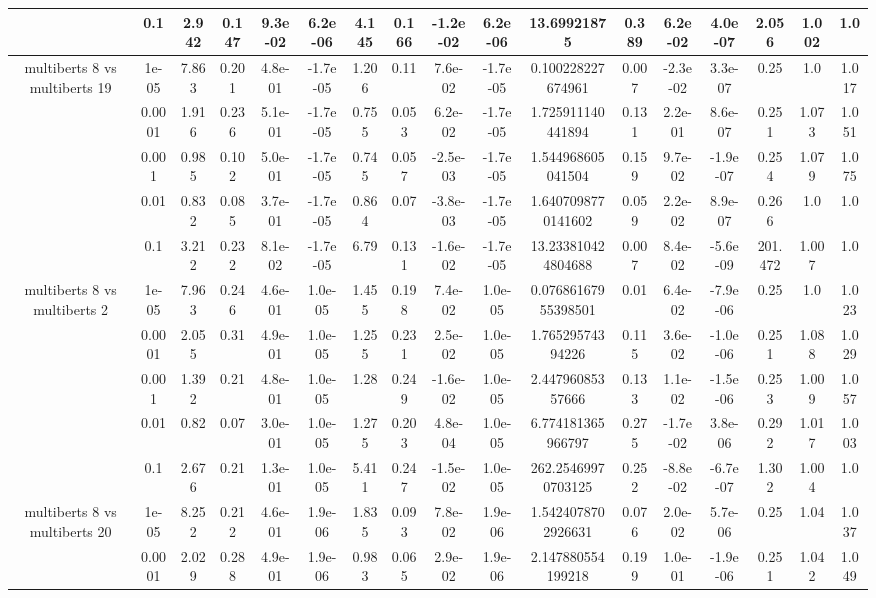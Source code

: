\begin{tabular}{|c|c|c|c|c|c|c|c|c|c|c|c|c|c|c|c|c|}
 & 0.1 & 2.942 & 0.147 & 9.3e-02 & 6.2e-06 & 4.145 & 0.166 & -1.2e-02 & 6.2e-06 & 13.69921875 & 0.389 & 6.2e-02 & 4.0e-07 & 2.056 & 1.002 & 1.0 \\
\hline
\multirow{5}{*}{multiberts 8 vs multiberts 19} & 1e-05 & 7.863 & 0.201 & 4.8e-01 & -1.7e-05 & 1.206 & 0.11 & 7.6e-02 & -1.7e-05 & 0.100228227674961 & 0.007 & -2.3e-02 & 3.3e-07 & 0.25 & 1.0 & 1.017 \\
 & 0.0001 & 1.916 & 0.236 & 5.1e-01 & -1.7e-05 & 0.755 & 0.053 & 6.2e-02 & -1.7e-05 & 1.725911140441894 & 0.131 & 2.2e-01 & 8.6e-07 & 0.251 & 1.073 & 1.051 \\
 & 0.001 & 0.985 & 0.102 & 5.0e-01 & -1.7e-05 & 0.745 & 0.057 & -2.5e-03 & -1.7e-05 & 1.544968605041504 & 0.159 & 9.7e-02 & -1.9e-07 & 0.254 & 1.079 & 1.075 \\
 & 0.01 & 0.832 & 0.085 & 3.7e-01 & -1.7e-05 & 0.864 & 0.07 & -3.8e-03 & -1.7e-05 & 1.6407098770141602 & 0.059 & 2.2e-02 & 8.9e-07 & 0.266 & 1.0 & 1.0 \\
 & 0.1 & 3.212 & 0.232 & 8.1e-02 & -1.7e-05 & 6.79 & 0.131 & -1.6e-02 & -1.7e-05 & 13.233810424804688 & 0.007 & 8.4e-02 & -5.6e-09 & 201.472 & 1.007 & 1.0 \\
\hline
\multirow{5}{*}{multiberts 8 vs multiberts 2} & 1e-05 & 7.963 & 0.246 & 4.6e-01 & 1.0e-05 & 1.455 & 0.198 & 7.4e-02 & 1.0e-05 & 0.07686167955398501 & 0.01 & 6.4e-02 & -7.9e-06 & 0.25 & 1.0 & 1.023 \\
 & 0.0001 & 2.055 & 0.31 & 4.9e-01 & 1.0e-05 & 1.255 & 0.231 & 2.5e-02 & 1.0e-05 & 1.76529574394226 & 0.115 & 3.6e-02 & -1.0e-06 & 0.251 & 1.088 & 1.029 \\
 & 0.001 & 1.392 & 0.21 & 4.8e-01 & 1.0e-05 & 1.28 & 0.249 & -1.6e-02 & 1.0e-05 & 2.44796085357666 & 0.133 & 1.1e-02 & -1.5e-06 & 0.253 & 1.009 & 1.057 \\
 & 0.01 & 0.82 & 0.07 & 3.0e-01 & 1.0e-05 & 1.275 & 0.203 & 4.8e-04 & 1.0e-05 & 6.774181365966797 & 0.275 & -1.7e-02 & 3.8e-06 & 0.292 & 1.017 & 1.003 \\
 & 0.1 & 2.676 & 0.21 & 1.3e-01 & 1.0e-05 & 5.411 & 0.247 & -1.5e-02 & 1.0e-05 & 262.25469970703125 & 0.252 & -8.8e-02 & -6.7e-07 & 1.302 & 1.004 & 1.0 \\
\hline
\multirow{5}{*}{multiberts 8 vs multiberts 20} & 1e-05 & 8.252 & 0.212 & 4.6e-01 & 1.9e-06 & 1.835 & 0.093 & 7.8e-02 & 1.9e-06 & 1.5424078702926631 & 0.076 & 2.0e-02 & 5.7e-06 & 0.25 & 1.04 & 1.037 \\
 & 0.0001 & 2.029 & 0.288 & 4.9e-01 & 1.9e-06 & 0.983 & 0.065 & 2.9e-02 & 1.9e-06 & 2.147880554199218 & 0.199 & 1.0e-01 & -1.9e-06 & 0.251 & 1.042 & 1.049 \\

\end{tabular}
